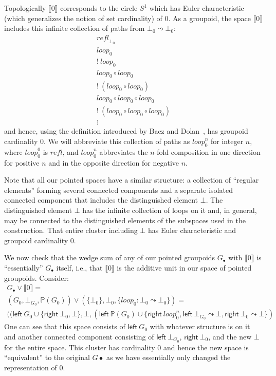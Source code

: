 \documentclass[11pt]{article}
\newcommand{\union}{\cup}
\newcommand{\refl}{\mathit{refl}}
\renewcommand{\path}{\leadsto}
\newcommand{\paths}[1]{\mathds{P}(#1)}
\newcommand{\dt}[1]{\llbracket #1 \rrbracket}
\newcommand{\leftv}[1]{\textsf{left}~#1}
\newcommand{\rightv}[1]{\textsf{right}~#1}
\newcommand{\wedgesum}{\vee}
\begin{document}
Topologically $\dt{0}$ corresponds to the circle $S^1$ which has Euler
characteristic (which generalizes the notion of set cardinality) of 0. As a
groupoid, the space $\dt{0}$ includes this infinite collection of paths from
$\bot_0 \path \bot_0$:
\[\begin{array}{l}
\refl_{\bot_0} \\
\mathit{loop}_0 \\
!~\mathit{loop}_0 \\
\mathit{loop}_0 \circ \mathit{loop}_0 \\
!~(\mathit{loop}_0 \circ \mathit{loop}_0) \\
\mathit{loop}_0 \circ \mathit{loop}_0 \circ \mathit{loop}_0 \\
!~(\mathit{loop}_0 \circ \mathit{loop}_0 \circ \mathit{loop}_0) \\
\vdots
\end{array}\]
and hence, using the definition introduced by Baez and
Dolan~\cite{groupoidcard}, has groupoid cardinality 0. We will abbreviate
this collection of paths as $\mathit{loop}^n_0$ for integer $n$, where
$\mathit{loop}^0_0$ is $\refl$, and $\mathit{loop}^n_0$ abbreviates the
$n$-fold composition in one direction for positive $n$ and in the opposite
direction for negative $n$.

Note that all our pointed spaces have a similar structure: a collection of
``regular elements'' forming several connected components and a separate
isolated connected component that includes the distinguished element
$\bot$. The distinguished element $\bot$ has the infinite collection of loops
on it and, in general, may be connected to the distinguished elements of the
subspaces used in the construction. That entire cluster including $\bot$ has
Euler characteristic and groupoid cardinality 0.

We now check that the wedge sum of any of our pointed groupoids $G_\bullet$
with $\dt{0}$ is ``essentially'' $G_\bullet$ itself, i.e., that $\dt{0}$ is
the additive unit in our space of pointed groupoids. Consider:
\[\begin{array}{l}
G_\bullet \wedgesum \dt{0} = \\
(G_0, \bot_{G_0}, \paths{G_0}) \wedgesum 
  (\{ \bot_0 \}, \bot_0, \{ \mathit{loop}_0 : \bot_0 \path \bot_0 \}) = \\
((\leftv{G_0} \union \{ \rightv{\bot_0}, \bot \}, 
 \bot,
 (\leftv{\paths{G_0}} \union \{ \rightv{\mathit{loop}^n_0} , 
 \leftv{\bot_{G_0}} \path \bot, \rightv{\bot_0} \path \bot \})
\end{array}\]
One can see that this space consists of $\leftv{G_0}$ with whatever structure
is on it and another connected component consisting of $\leftv{\bot_{G_0}}$,
$\rightv{\bot_0}$, and the new $\bot$ for the entire space. This cluster has
cardinality 0 and hence the new space is ``equivalent'' to the original
$G\bullet$ as we have essentially only changed the representation of 0. 
\end{document}
